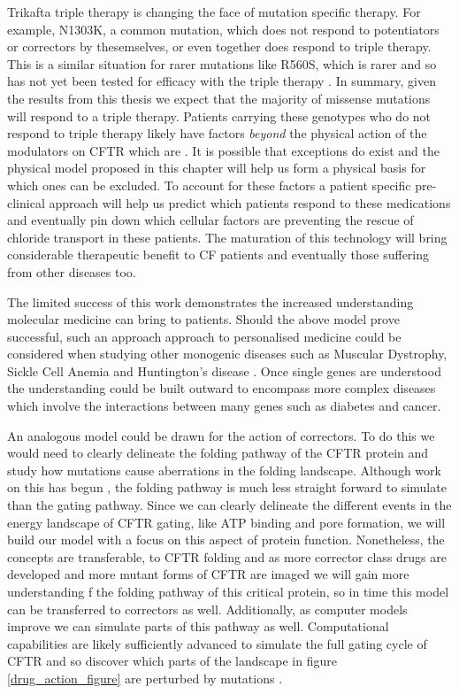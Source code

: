 Trikafta triple therapy is changing the face of mutation specific therapy. For example, N1303K, a common mutation, which does not respond to potentiators or correctors by thesemselves, or even together \cite{} does respond to triple therapy. This is a similar situation for rarer mutations like R560S, which is rarer and so has not yet been tested for efficacy with the triple therapy \cite{awatade2019}. In summary, given the results from this thesis we expect that the majority of missense mutations will respond to a triple therapy. Patients carrying these genotypes who do not respond to triple therapy likely have factors \textit{beyond} the physical action of the modulators on CFTR which are . It is possible that exceptions do exist and the physical model proposed in this chapter will help us form a physical basis for which ones can be excluded. To account for these factors a patient specific pre-clinical approach will help us predict which patients respond to these medications and eventually pin down which cellular factors are preventing the rescue of chloride transport in these patients. The maturation of this technology will bring considerable therapeutic benefit to CF patients and eventually those suffering from other diseases too.

The limited success of this work demonstrates the increased understanding molecular medicine can bring to patients. Should the above model prove successful, such an approach approach to personalised medicine could  be considered when studying other monogenic diseases such as Muscular Dystrophy, Sickle Cell Anemia and Huntington's disease \cite{}.  Once single genes are understood the understanding could be built outward to encompass more complex diseases which involve the interactions between many genes such as diabetes and cancer. 

An analogous model could be drawn for the action of correctors. To do this we would need to clearly delineate the folding pathway of the CFTR protein and study how mutations cause aberrations in the folding landscape. Although work on this has begun \cite{krainer2018, kleizen2021, kleizen2020, fiedorczuk2022}, the folding pathway is much less straight forward to simulate than the gating pathway. Since we can clearly delineate the different events in the energy landscape of CFTR gating, like ATP binding and pore formation, we will build our model with a focus on this aspect of protein function. Nonetheless, the concepts are transferable, to CFTR folding and as more corrector class drugs are developed and more mutant forms of CFTR are imaged we will gain more understanding f the folding pathway of this critical protein, so in time this model can be transferred to correctors as well. Additionally, as computer models improve we can simulate parts of this pathway as well. Computational capabilities are likely sufficiently advanced to simulate the full gating cycle of CFTR and so discover which parts of the landscape in figure \ref{drug_action_figure} are perturbed by mutations \cite{}. 

